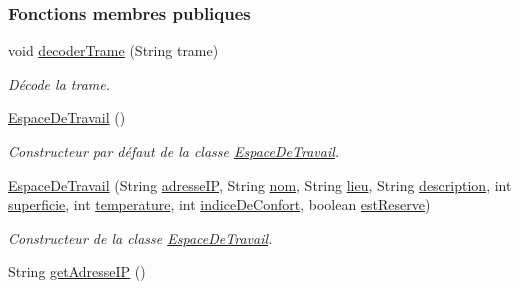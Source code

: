 \subsubsection*{Fonctions membres publiques}
\begin{DoxyCompactItemize}
\item 
void \hyperlink{classcom_1_1lasalle_1_1meeting_1_1_espace_de_travail_aa922390b20b7b79bcde660290f378997}{decoder\+Trame} (String trame)
\begin{DoxyCompactList}\small\item\em Décode la trame. \end{DoxyCompactList}\item 
\hyperlink{classcom_1_1lasalle_1_1meeting_1_1_espace_de_travail_a3940b7fa99249447112b00ec89fcd3d1}{Espace\+De\+Travail} ()
\begin{DoxyCompactList}\small\item\em Constructeur par défaut de la classe \hyperlink{classcom_1_1lasalle_1_1meeting_1_1_espace_de_travail}{Espace\+De\+Travail}. \end{DoxyCompactList}\item 
\hyperlink{classcom_1_1lasalle_1_1meeting_1_1_espace_de_travail_aa1f0c767a1b77048cfad17bbd49e9fe5}{Espace\+De\+Travail} (String \hyperlink{classcom_1_1lasalle_1_1meeting_1_1_espace_de_travail_aa4d9547d0170feeeb49c123e36226b79}{adresse\+IP}, String \hyperlink{classcom_1_1lasalle_1_1meeting_1_1_espace_de_travail_a9c06de6de73757cbec902e14055969ce}{nom}, String \hyperlink{classcom_1_1lasalle_1_1meeting_1_1_espace_de_travail_a375f1e6b0d3590706d863f6dbd86dd11}{lieu}, String \hyperlink{classcom_1_1lasalle_1_1meeting_1_1_espace_de_travail_a4633baf86d38c201c7e288fda3604bd7}{description}, int \hyperlink{classcom_1_1lasalle_1_1meeting_1_1_espace_de_travail_a3a5b9c42fa29930b092154e1bd0e4c10}{superficie}, int \hyperlink{classcom_1_1lasalle_1_1meeting_1_1_espace_de_travail_ad5349fa46af27855755ce6cee644a6e2}{temperature}, int \hyperlink{classcom_1_1lasalle_1_1meeting_1_1_espace_de_travail_a6a75c9c45ccb98895e02a1864bf4a41d}{indice\+De\+Confort}, boolean \hyperlink{classcom_1_1lasalle_1_1meeting_1_1_espace_de_travail_a8913c30ae6b72ae4f35962b1ecfc496b}{est\+Reserve})
\begin{DoxyCompactList}\small\item\em Constructeur de la classe \hyperlink{classcom_1_1lasalle_1_1meeting_1_1_espace_de_travail}{Espace\+De\+Travail}. \end{DoxyCompactList}\item 
String \hyperlink{classcom_1_1lasalle_1_1meeting_1_1_espace_de_travail_a24e21e44c3fc6ea5a8c68ab2cb1e22e3}{get\+Adresse\+IP} ()

\end{DoxyCompactItemize}
